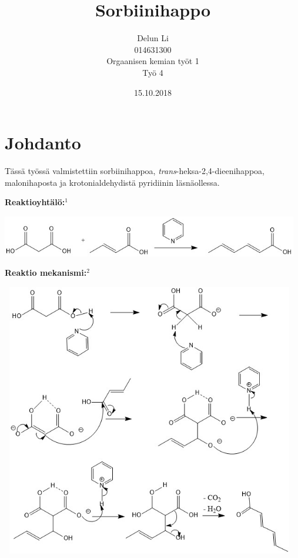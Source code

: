 \documentclass[11pt,a4paper]{article}
\title{Sorbiinihappo}
\author{Delun Li\\014631300\\Orgaanisen kemian työt 1\\Työ 4}
\date{15.10.2018}
\begin{document}
\pagebreak


\maketitle

\pagebreak

\section{Johdanto}

Tässä työssä valmistettiin sorbiinihappoa, \textit{trans}-heksa-2,4-dieenihappoa, malonihaposta ja krotonialdehydistä pyridiinin läsnäollessa. 

\vspace{0.5cm}

\noindent \textbf{Reaktioyhtälö:}$^1$

\vspace{0.3cm}

\hspace{-0.6cm}\includegraphics[width=13cm]{sorbiinihappo.jpg}

\vspace{0.5cm}

\noindent \textbf{Reaktio mekanismi:}$^2$

\vspace{0.3cm}

\hspace{-0.6cm}\includegraphics[height=12cm, width=13cm]{sorbiinihappomek.jpg}
\end{document}
